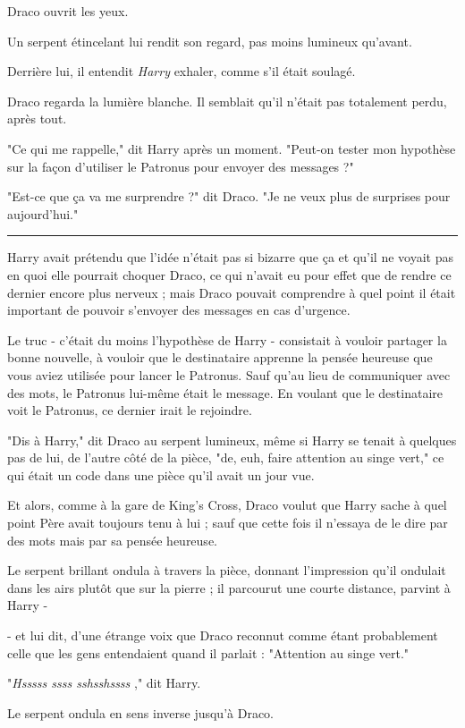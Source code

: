 Draco ouvrit les yeux.

Un serpent étincelant lui rendit son regard, pas moins lumineux qu'avant.

Derrière lui, il entendit \emph{Harry}  exhaler, comme s'il était soulagé.

Draco regarda la lumière blanche. Il semblait qu'il n'était pas totalement perdu, après tout.

"Ce qui me rappelle," dit Harry après un moment. "Peut-on tester mon hypothèse sur la façon d'utiliser le Patronus pour envoyer des messages ?"

"Est-ce que ça va me surprendre ?" dit Draco. "Je ne veux plus de surprises pour aujourd'hui."
\par\noindent\rule{\textwidth}{0.4pt}
Harry avait prétendu que l'idée n'était pas si bizarre que ça et qu'il ne voyait pas en quoi elle pourrait choquer Draco, ce qui n'avait eu pour effet que de rendre ce dernier encore plus nerveux ; mais Draco pouvait comprendre à quel point il était important de pouvoir s'envoyer des messages en cas d'urgence.

Le truc - c'était du moins l'hypothèse de Harry - consistait à vouloir partager la bonne nouvelle, à vouloir que le destinataire apprenne la pensée heureuse que vous aviez utilisée pour lancer le Patronus. Sauf qu'au lieu de communiquer avec des mots, le Patronus lui-même était le message. En voulant que le destinataire voit le Patronus, ce dernier irait le rejoindre.

"Dis à Harry," dit Draco au serpent lumineux, même si Harry se tenait à quelques pas de lui, de l'autre côté de la pièce, "de, euh, faire attention au singe vert," ce qui était un code dans une pièce qu'il avait un jour vue.

Et alors, comme à la gare de King's Cross, Draco voulut que Harry sache à quel point Père avait toujours tenu à lui ; sauf que cette fois il n'essaya de le dire par des mots mais par sa pensée heureuse.

Le serpent brillant ondula à travers la pièce, donnant l'impression qu'il ondulait dans les airs plutôt que sur la pierre ; il parcourut une courte distance, parvint à Harry -

- et lui dit, d'une étrange voix que Draco reconnut comme étant probablement celle que les gens entendaient quand il parlait : "Attention au singe vert."

"\emph{Hsssss ssss sshsshssss} ," dit Harry.

Le serpent ondula en sens inverse jusqu'à Draco.

